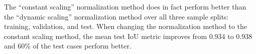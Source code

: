 The \enquote{constant scaling} normalization method does in fact perform better than the \enquote{dynamic scaling} normalization method over all three sample splits: training, validation, and test.
When changing the normalization method to the constant scaling method, the mean test IoU metric improves from \num{0.934} to \num{0.938} and 60\% of the test cases perform better.

